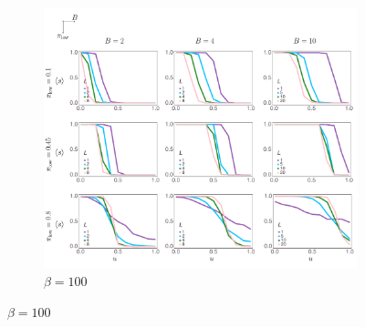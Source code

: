 \documentclass[letterpaper,11.5pt]{scrartcl}
\begin{document}
\newpage

\begin{figure}
  \ContinuedFloat
  \begin{subfigure}{\textwidth}
	\caption{$\beta = 100$}
	\includegraphics[width=\textwidth]{Figures/supplement/sensitivity_tau=0.01/mainResultsPlots.pdf}
  \end{subfigure}
\end{figure}
\end{document}
